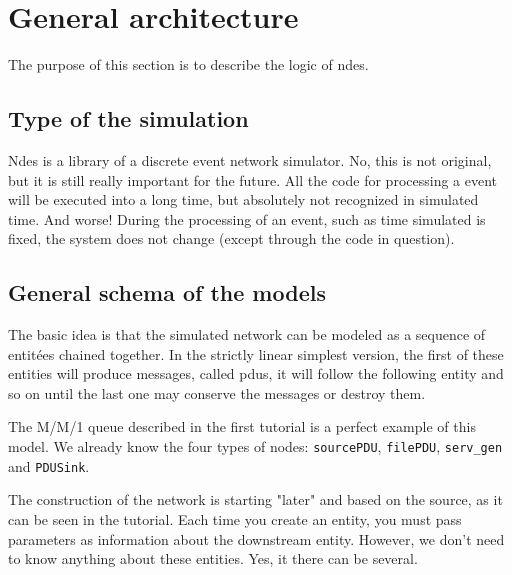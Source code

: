 %
\section{General architecture}
\label{section:architecture}

   
The purpose of this section is to describe the logic of {\sc
ndes}.

%
\subsection{Type of the simulation}

   {\sc Ndes} is a library of a discrete event network
simulator. No, this is not original, but it is still
really important for the future. All the code for processing a
event will be executed into a long time, but absolutely not recognized in simulated time. And worse! During the processing of an event, such as time
simulated is fixed, the system does not change (except through the code in
question). 

%
\subsection{General schema of the models}

   The basic idea is that the simulated network can be
modeled as a sequence of entitées chained together. In the
strictly linear simplest version, the first of these
entities will produce messages, called {\sc pdu}s, it will
follow the following entity and so on until the last one
may conserve the messages or destroy them.

   The M/M/1 queue described in the first tutorial is a perfect
example of this model. We already know the four types of
nodes: {\tt sourcePDU}, {\tt filePDU}, {\tt serv\_gen} and {\tt PDUSink}.

   The construction of the network is starting "later" and
based on the source, as it can be seen in the
tutorial. Each time you create an entity, you must pass
parameters as information about the downstream entity. 
However, we don't need to know anything about these entities. Yes, it
there can be several.

